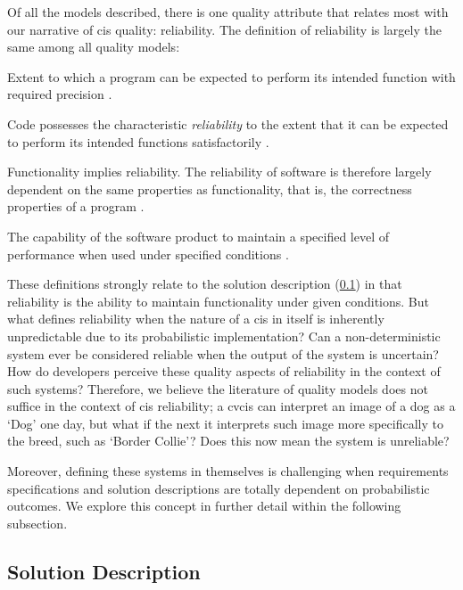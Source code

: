 Of all the models described, there is one quality attribute that relates most with our narrative of \gls{cis} quality: reliability. The definition of reliability is largely the same among all quality models:

\begin{description}[font=\itshape,style=multiline,leftmargin=3cm]
  \item[\citeauthor{McCall:1977uy}] Extent to which a program can be expected to perform its intended function with required precision \citep{McCall:1977uy}.
  \item[\citeauthor{Boehm:1978vv}] Code possesses the characteristic \textit{reliability} to the extent that it can be expected to perform its intended functions satisfactorily \citep{Boehm:1978vv}.
  \item[\citeauthor{Dromey:1995wy}] Functionality implies reliability. The reliability of software is therefore largely dependent on the same properties as functionality, that is, the correctness properties of a program \citep{Dromey:1995wy}.
  \item[ISO/IEC-9126] The capability of the software product to maintain a specified level of performance when used under specified conditions \citep{ISO9126:1999}.
\end{description}

These definitions strongly relate to the solution description (\cref{ssec:background:software-quality:solution-description}) in that reliability is the ability to maintain functionality under given conditions. But what defines reliability when the nature of a \gls{cis} in itself is inherently unpredictable due to its probabilistic implementation? Can a non-deterministic system ever be considered reliable when the output of the system is uncertain? How do developers perceive these quality aspects of reliability in the context of such systems? Therefore, we believe the literature of quality models does not suffice in the context of \gls{cis} reliability; a \gls{cvcis} can interpret an image of a dog as a `Dog' one day, but what if the next it interprets such image more specifically to the breed, such as `Border Collie'? Does this now mean the system is unreliable? 

Moreover, defining these systems in themselves is challenging when requirements specifications and solution descriptions are totally dependent on probabilistic outcomes. We explore this concept in further detail within the following subsection.

\subsection{Solution Description}
\label{ssec:background:software-quality:solution-description}
